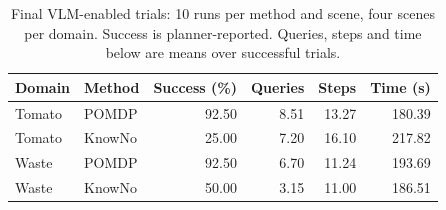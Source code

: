 \begin{table}[t]
\centering
\caption{Final VLM-enabled trials: 10 runs per method and scene, four scenes per domain. Success is planner-reported. Queries, steps and time below are means over successful trials.}
\label{tab:vlm_final_20261005}
\begin{tabular}{llrrrr}
\hline Domain & Method & Success (\%) & Queries & Steps & Time (s) \\
\hline
Tomato & POMDP & 92.50 & 8.51 & 13.27 & 180.39 \\
Tomato & KnowNo & 25.00 & 7.20 & 16.10 & 217.82 \\
Waste & POMDP & 92.50 & 6.70 & 11.24 & 193.69 \\
Waste & KnowNo & 50.00 & 3.15 & 11.00 & 186.51 \\
\hline
\end{tabular}
\end{table}
